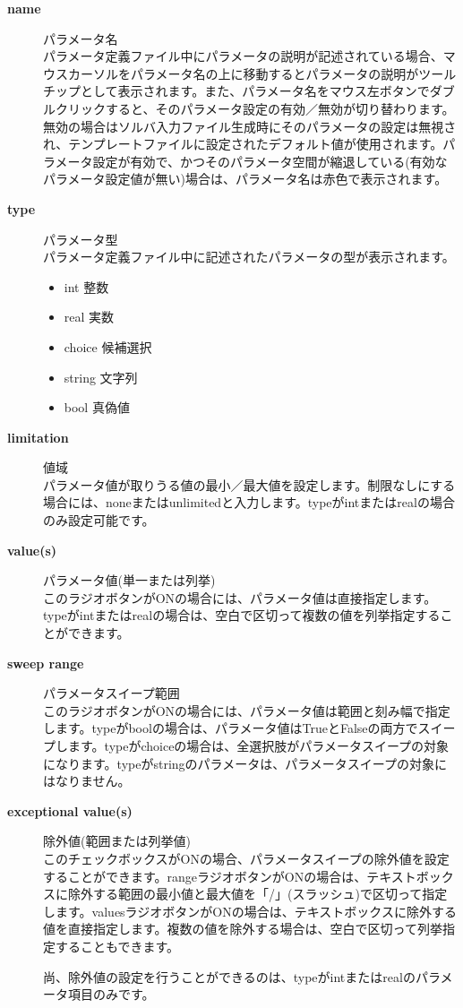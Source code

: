 \documentclass[a4paper,11pt]{jarticle}
\begin{document}
\begin{description}
\item[{\bf name}] パラメータ名\\
パラメータ定義ファイル中にパラメータの説明が記述されている場合、マウスカーソルをパラメータ名の上に移動するとパラメータの説明がツールチップとして表示されます。また、パラメータ名をマウス左ボタンでダブルクリックすると、そのパラメータ設定の有効／無効が切り替わります。無効の場合はソルバ入力ファイル生成時にそのパラメータの設定は無視され、テンプレートファイルに設定されたデフォルト値が使用されます。パラメータ設定が有効で、かつそのパラメータ空間が縮退している(有効なパラメータ設定値が無い)場合は、パラメータ名は赤色で表示されます。

\item[{\bf type}] パラメータ型\\
パラメータ定義ファイル中に記述されたパラメータの型が表示されます。
\begin{itemize}
\item int 整数
\item real 実数
\item choice 候補選択
\item string 文字列
\item bool 真偽値
\end{itemize}

\item[{\bf limitation}] 値域\\
パラメータ値が取りうる値の最小／最大値を設定します。制限なしにする場合には、noneまたはunlimitedと入力します。typeがintまたはrealの場合のみ設定可能です。

\item[{\bf value(s)}] パラメータ値(単一または列挙)\\
このラジオボタンがONの場合には、パラメータ値は直接指定します。typeがintまたはrealの場合は、空白で区切って複数の値を列挙指定することができます。

\item[{\bf sweep range}] パラメータスイープ範囲\\
このラジオボタンがONの場合には、パラメータ値は範囲と刻み幅で指定します。typeがboolの場合は、パラメータ値はTrueとFalseの両方でスイープします。typeがchoiceの場合は、全選択肢がパラメータスイープの対象になります。typeがstringのパラメータは、パラメータスイープの対象にはなりません。

\item[{\bf exceptional value(s)}] 除外値(範囲または列挙値)\\
このチェックボックスがONの場合、パラメータスイープの除外値を設定することができます。rangeラジオボタンがONの場合は、テキストボックスに除外する範囲の最小値と最大値を「/」(スラッシュ)で区切って指定します。valuesラジオボタンがONの場合は、テキストボックスに除外する値を直接指定します。複数の値を除外する場合は、空白で区切って列挙指定することもできます。

尚、除外値の設定を行うことができるのは、typeがintまたはrealのパラメータ項目のみです。
\end{description}
\end{document}
